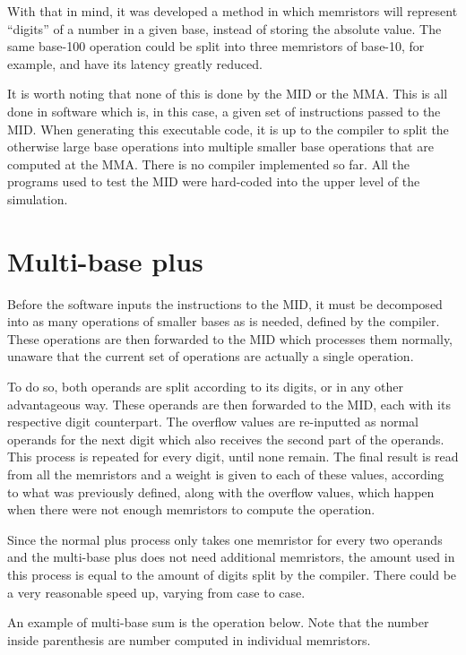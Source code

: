 \documentclass[ecp,tc,english]{iiufrgs}
\begin{document}
With that in mind, it was developed a method in which memristors will represent “digits” of a number in a given base, instead of storing the absolute value. The same base-100 operation could be split into three memristors of base-10, for example, and have its latency greatly reduced.

It is worth noting that none of this is done by the MID or the MMA. This is all done in software which is, in this case, a given set of instructions passed to the MID. When generating this executable code, it is up to the compiler to split the otherwise large base operations into multiple smaller base operations that are computed at the MMA. There is no compiler implemented so far. All the programs used to test the MID were hard-coded into the upper level of the simulation.

\section{Multi-base plus}

Before the software inputs the instructions to the MID, it must be decomposed into as many operations of smaller bases as is needed, defined by the compiler. These operations are then forwarded to the MID which processes them normally, unaware that the current set of operations are actually a single operation.

To do so, both operands are split according to its digits, or in any other advantageous way. These operands are then forwarded to the MID, each with its respective digit counterpart. The overflow values are re-inputted as normal operands for the next digit which also receives the second part of the operands. This process is repeated for every digit, until none remain. The final result is read from all the memristors and a weight is given to each of these values, according to what was previously defined, along with the overflow values, which happen when there were not enough memristors to compute the operation.

Since the normal plus process only takes one memristor for every two operands and the multi-base plus does not need additional memristors, the amount used in this process is equal to the amount of digits split by the compiler. There could be a very reasonable speed up, varying from case to case.

An example of multi-base sum is the operation below. Note that the number inside parenthesis are number computed in individual memristors.
\end{document}
